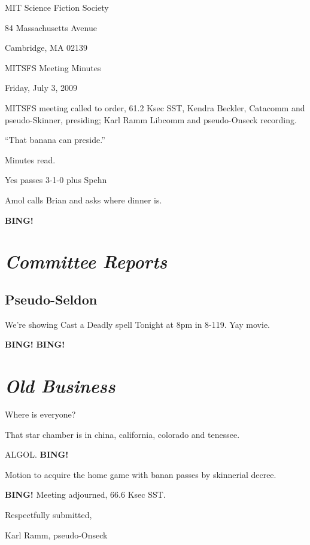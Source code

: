 \documentclass[10pt]{article}
\newcommand{\bing}{{\bf BING!} }
\newcommand{\goto}[1]{\bing \vskip 12pt \section*{{\em{#1}}}}
\newcommand{\ps}{ plus Spehn\xspace}
\begin{document}
\begin{center}

MIT Science Fiction Society

84 Massachusetts Avenue

Cambridge, MA 02139

\vspace{12pt}

MITSFS Meeting Minutes

Friday, July 3, 2009

\end{center}

\vspace{18pt}

\setlength{\parskip}{6pt}

\noindent
MITSFS meeting called to order, 61.2 Ksec SST, Kendra Beckler, Catacomm and
pseudo-Skinner, presiding; Karl Ramm Libcomm and pseudo-Onseck recording.

``That banana can preside.''

Minutes read.

Yes passes 3-1-0 \ps

Amol calls Brian and asks where dinner is.

\goto{Committee Reports}

\subsection*{Pseudo-Seldon}

We're showing Cast a Deadly spell Tonight at 8pm in 8-119.  Yay movie.

\bing
\goto{Old Business}

Where is everyone?

That star chamber is in china, california, colorado and tenessee.

ALGOL.
\bing

Motion to acquire the home game with banan passes by skinnerial decree.

\bing
\noindent
Meeting adjourned, 66.6 Ksec SST.

\vspace{18pt}

\centerline{Respectfully submitted,}
\centerline{Karl Ramm, pseudo-Onseck}
\end{document}

